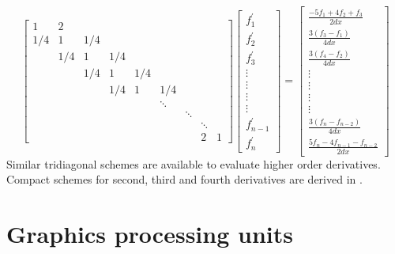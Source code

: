 \begin{equation}
 \label{eqn:compact-tridiagonal-system}
 \begin{bmatrix}
     1&2\\
     1/4&1&1/4\\
     &1/4&1&1/4\\
     &&1/4&1&1/4\\
     &&&1/4&1&1/4\\
     &&&&&\ddots\\
     &&&&&&\ddots\\
     &&&&&&&\ddots\\
     &&&&&&&2&1
  \end{bmatrix}
  \begin{bmatrix}
      f^{\prime}_1 \\

      f^{\prime}_2 \\
      f^{\prime}_3 \\
      \vdots \\
      \vdots \\
      \vdots \\
      \vdots \\
      f^{\prime}_{n-1} \\
      f^{\prime}_n
   \end{bmatrix}
 =
 \begin{bmatrix}
     \frac{-5f_1 + 4f_2 + f_3}{2dx}\\
     \frac{3(f_{3} - f_{1})}{4dx}\\
     \frac{3(f_{4} - f_{2})}{4dx}\\
     \vdots\\
     \vdots\\
     \vdots\\
     \vdots\\
     \frac{3(f_{n} - f_{n-2})}{4dx}\\
     \frac{5f_{n} - 4f_{n-1} - f_{n-2}}{2dx}
  \end{bmatrix}
\end{equation}
%
Similar tridiagonal schemes are available
to evaluate higher order derivatives.
Compact schemes for
second, third and fourth derivatives
are derived in \cite{lele1992compact}.

\section{Graphics processing units}

